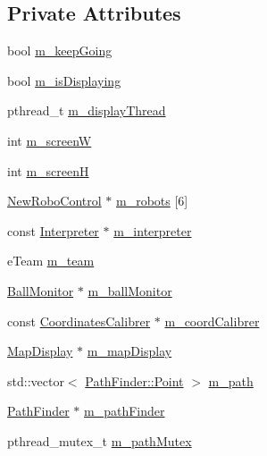 \subsection*{Private Attributes}
\begin{DoxyCompactItemize}
\item 
bool \hyperlink{classRefereeDisplay_af3bb14682e53eef2d7d9e664f84e6ba1}{m\_\-keepGoing}
\item 
bool \hyperlink{classRefereeDisplay_a12bdb098bcf59351f55bc7beb922ac62}{m\_\-isDisplaying}
\item 
pthread\_\-t \hyperlink{classRefereeDisplay_aded3908927ad3726777ece4d52cf3ca2}{m\_\-displayThread}
\item 
int \hyperlink{classRefereeDisplay_aed7aa88d65bc9b4f79fe8dd2598a92e5}{m\_\-screenW}
\item 
int \hyperlink{classRefereeDisplay_a136af0a18d0eadffbcaa755fdf76e328}{m\_\-screenH}
\item 
\hyperlink{classNewRoboControl}{NewRoboControl} $\ast$ \hyperlink{classRefereeDisplay_a4a777a38327f96fe1e5c9051b6c3c38f}{m\_\-robots} \mbox{[}6\mbox{]}
\item 
const \hyperlink{classInterpreter}{Interpreter} $\ast$ \hyperlink{classRefereeDisplay_a510383c894f917032aadc71f1f31074f}{m\_\-interpreter}
\item 
eTeam \hyperlink{classRefereeDisplay_a02ec6cdc79904b4727553f6802c36d9e}{m\_\-team}
\item 
\hyperlink{classBallMonitor}{BallMonitor} $\ast$ \hyperlink{classRefereeDisplay_ab3a1d764a476c413ed1f19be2c9a1215}{m\_\-ballMonitor}
\item 
const \hyperlink{classCoordinatesCalibrer}{CoordinatesCalibrer} $\ast$ \hyperlink{classRefereeDisplay_a7be832637684b08b915a2ff3c6c0d9f2}{m\_\-coordCalibrer}
\item 
\hyperlink{classMapDisplay}{MapDisplay} $\ast$ \hyperlink{classRefereeDisplay_a07fda892af04771c6484160fb0e5585f}{m\_\-mapDisplay}
\item 
std::vector$<$ \hyperlink{structPathFinder_1_1Point}{PathFinder::Point} $>$ \hyperlink{classRefereeDisplay_a582b6bcc0204a2876b629e8ceebc8abd}{m\_\-path}
\item 
\hyperlink{classPathFinder}{PathFinder} $\ast$ \hyperlink{classRefereeDisplay_a0ccee8231a72e1a906dff856e072d5a0}{m\_\-pathFinder}
\item 
pthread\_\-mutex\_\-t \hyperlink{classRefereeDisplay_a2ec44bb3c993cb8e518a730153116da7}{m\_\-pathMutex}
\end{DoxyCompactItemize}


